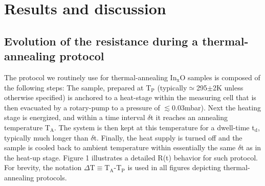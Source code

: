 \documentclass
[preprint,showpacs,byrevtex,10pt,twocolumn,tightenlines,prl,letterpaper]{revtex4}%
\begin{document}
\section{Results and discussion}

\subsection{Evolution of the resistance during a thermal-annealing protocol}

The protocol we routinely use for thermal-annealing In$_{\text{x}}$O samples
is composed of the following steps: The sample, prepared at T$_{\text{P}}$
(typically$\simeq$295$\pm$2K unless otherwise specified) is anchored to a
heat-stage within the measuring cell that is then evacuated by a rotary-pump
to a pressure of $\lesssim$0.03mbar). Next the heating stage is energized, and
within a time interval $\delta$t it reaches an annealing temperature
T$_{\text{A}}$. The system is then kept at this temperature for a dwell-time
t$_{\text{d}}$, typically much longer than $\delta$t. Finally, the heat supply
is turned off and the sample is cooled back to ambient temperature within
essentially the same $\delta$t as in the heat-up stage. Figure 1 illustrates a
detailed R(t) behavior for such protocol. For brevity, the notation $\Delta
$T$\equiv$T$_{\text{A}}$-T$_{\text{P}}$ is used in all figures depicting
thermal-annealing protocols.
\end{document}
